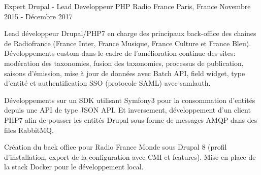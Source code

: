 \cventry
{Expert Drupal - Lead Developpeur PHP} %
{Radio France} %
{Paris, France} %
{Novembre 2015 - Décembre 2017} %
{
\begin{cvitems} %
    \item
    {
        Lead développeur Drupal/PHP7 en charge des principaux back-office des chaines de Radiofrance (France Inter, France Musique, France Culture et France Bleu). 
        Développements custom dans le cadre de l'amélioration continue des sites: modération des taxonomies, fusion des taxonomies, processus de publication, saisons d’émission,
        mise à jour de données avec Batch API, field widget, type d'entité et authentification SSO (protocole SAML) avec samlauth.
    }
    \item
    {
        Développements sur un SDK utilisant Symfony3 pour la consommation d’entités depuis une API de type JSON API. Et inversement, développement
        d'un client PHP7 afin de pousser les entités Drupal sous forme de messages AMQP dans des files RabbitMQ.
    }
    \item
    {
        Création du back office pour Radio France Monde sous Drupal 8 (profil d’installation, export de la configuration avec CMI et features). Mise en place de la stack Docker pour le développement local.
    }
\end{cvitems}
}
